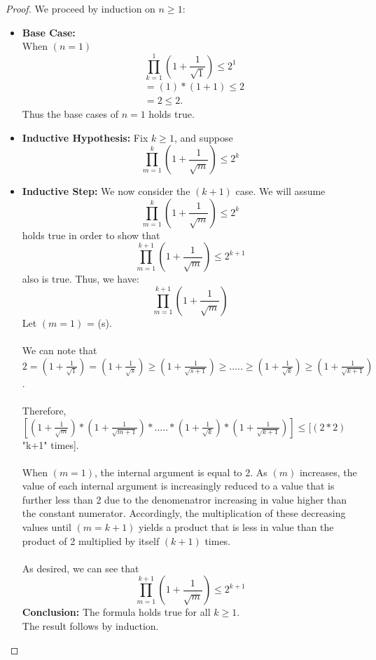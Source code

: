 \documentclass[11pt]{article}
\theoremstyle{definition}
\theoremstyle{definition}
\theoremstyle{definition}
\begin{document}
\begin{proof} We proceed by induction on $n \geq 1$: \
\begin{itemize}

\item \textbf{Base Case:}
\\ When $(n = 1)$
\[
\prod_{k=1}^{1} \left( 1 + \frac{1}{\sqrt{1}} \right) \leq 2^{1}
\]
\begin{align*}
&= (1)*( 1 + 1) \leq 2 \\
&= 2 \leq 2.
\end{align*}
Thus the base cases of $n = 1$ holds true.

\item \textbf{Inductive Hypothesis:} Fix $k \geq 1$, and suppose
\[
\prod_{m=1}^{k} \left( 1 + \frac{1}{\sqrt{m}} \right) \leq 2^{k}
\]

\item \textbf{Inductive Step:} We now consider the $(k+1)$ case. We will assume
\[
\prod_{m=1}^{k} \left( 1 + \frac{1}{\sqrt{m}} \right) \leq 2^{k}
\]
holds true in order to show that
\[
\prod_{m=1}^{k+1} \left( 1 + \frac{1}{\sqrt{m}} \right) \leq 2^{k+1}
\]
also is true. Thus, we have: \\
\[
\prod_{m=1}^{k+1} \left( 1 + \frac{1}{\sqrt{m}} \right)
\]
Let $(m=1)$ = (s). \\
\\ We can note that $2 = ( 1 + \frac{1}{\sqrt{1}}) = ( 1 + \frac{1}{\sqrt{s}}) \geq ( 1 + \frac{1}{\sqrt{s+1}}) \geq ..... \geq ( 1 + \frac{1}{\sqrt{k}}) \geq ( 1 + \frac{1}{\sqrt{k+1}})$. \\
\\ Therefore, $[( 1 + \frac{1}{\sqrt{m}}) * ( 1 + \frac{1}{\sqrt{m+1}}) * ..... * ( 1 + \frac{1}{\sqrt{k}}) * ( 1 + \frac{1}{\sqrt{k+1}})] \leq [(2*2)$ "k+1" times]. \\
\\ When $(m = 1)$, the internal argument is equal to 2. As $(m)$ increases, the value of each internal argument is increasingly reduced to a value that is further less than 2 due to the denomenatror increasing in value higher than the constant numerator. Accordingly, the multiplication of these decreasing values until $(m = k+1)$ yields a product that is less in value than the product of 2 multiplied by itself $(k+1)$ times. \\
\\ As desired, we can see that 
\[
\prod_{m=1}^{k+1} \left( 1 + \frac{1}{\sqrt{m}} \right) \leq 2^{k+1}
\]
\textbf{Conclusion:} The formula holds true for all $k \geq 1$. \\
The result follows by induction.
\end{itemize}

\end{proof}

\end{document}

